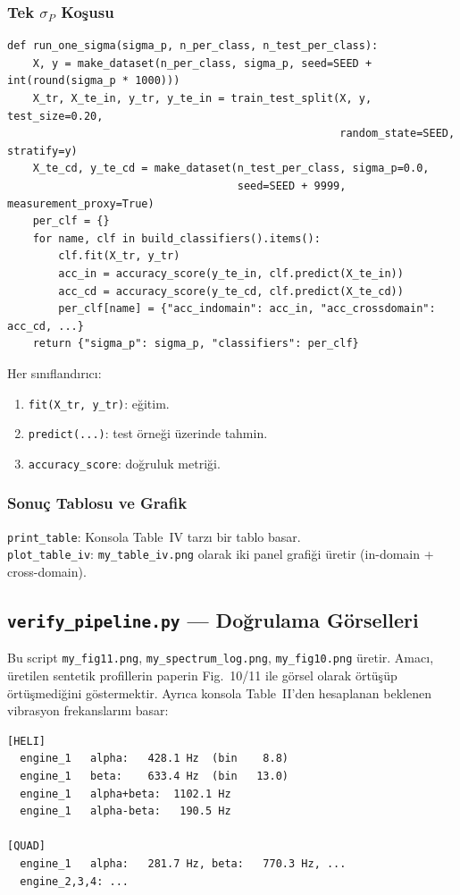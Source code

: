 \documentclass[11pt,a4paper]{article}
\begin{document}
\subsubsection{Tek $\sigma_P$ Koşusu}
\begin{lstlisting}
def run_one_sigma(sigma_p, n_per_class, n_test_per_class):
    X, y = make_dataset(n_per_class, sigma_p, seed=SEED + int(round(sigma_p * 1000)))
    X_tr, X_te_in, y_tr, y_te_in = train_test_split(X, y, test_size=0.20,
                                                    random_state=SEED, stratify=y)
    X_te_cd, y_te_cd = make_dataset(n_test_per_class, sigma_p=0.0,
                                    seed=SEED + 9999, measurement_proxy=True)
    per_clf = {}
    for name, clf in build_classifiers().items():
        clf.fit(X_tr, y_tr)
        acc_in = accuracy_score(y_te_in, clf.predict(X_te_in))
        acc_cd = accuracy_score(y_te_cd, clf.predict(X_te_cd))
        per_clf[name] = {"acc_indomain": acc_in, "acc_crossdomain": acc_cd, ...}
    return {"sigma_p": sigma_p, "classifiers": per_clf}
\end{lstlisting}
Her sınıflandırıcı:
\begin{enumerate}
    \item \texttt{fit(X\_tr, y\_tr)}: eğitim.
    \item \texttt{predict(...)}: test örneği üzerinde tahmin.
    \item \texttt{accuracy\_score}: doğruluk metriği.
\end{enumerate}

\subsubsection{Sonuç Tablosu ve Grafik}
\texttt{print\_table}: Konsola Table~IV tarzı bir tablo basar.\\
\texttt{plot\_table\_iv}: \texttt{my\_table\_iv.png} olarak iki panel grafiği üretir
(in-domain + cross-domain).

\subsection{\texttt{verify\_pipeline.py} — Doğrulama Görselleri}
Bu script \texttt{my\_fig11.png}, \texttt{my\_spectrum\_log.png}, \texttt{my\_fig10.png} üretir.
Amacı, üretilen sentetik profillerin paperin Fig.~10/11 ile görsel olarak örtüşüp örtüşmediğini
göstermektir. Ayrıca konsola Table~II'den hesaplanan beklenen vibrasyon frekanslarını basar:
\begin{lstlisting}
[HELI]
  engine_1   alpha:   428.1 Hz  (bin    8.8)
  engine_1   beta:    633.4 Hz  (bin   13.0)
  engine_1   alpha+beta:  1102.1 Hz
  engine_1   alpha-beta:   190.5 Hz

[QUAD]
  engine_1   alpha:   281.7 Hz, beta:   770.3 Hz, ...
  engine_2,3,4: ...
\end{lstlisting}
\end{document}
